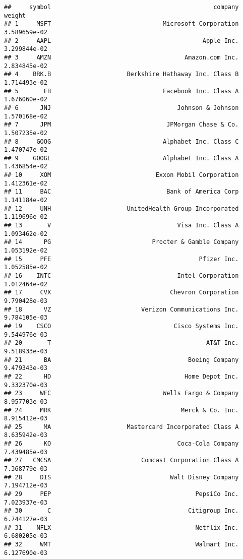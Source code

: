 \documentclass[
]{article}
\begin{document}
\begin{verbatim}
##     symbol                                             company       weight
## 1     MSFT                               Microsoft Corporation 3.589659e-02
## 2     AAPL                                          Apple Inc. 3.299844e-02
## 3     AMZN                                     Amazon.com Inc. 2.834845e-02
## 4    BRK.B                     Berkshire Hathaway Inc. Class B 1.714493e-02
## 5       FB                               Facebook Inc. Class A 1.676060e-02
## 6      JNJ                                   Johnson & Johnson 1.570168e-02
## 7      JPM                                JPMorgan Chase & Co. 1.507235e-02
## 8     GOOG                               Alphabet Inc. Class C 1.470747e-02
## 9    GOOGL                               Alphabet Inc. Class A 1.436854e-02
## 10     XOM                             Exxon Mobil Corporation 1.412361e-02
## 11     BAC                                Bank of America Corp 1.141184e-02
## 12     UNH                     UnitedHealth Group Incorporated 1.119696e-02
## 13       V                                   Visa Inc. Class A 1.093462e-02
## 14      PG                            Procter & Gamble Company 1.053192e-02
## 15     PFE                                         Pfizer Inc. 1.052585e-02
## 16    INTC                                   Intel Corporation 1.012464e-02
## 17     CVX                                 Chevron Corporation 9.790428e-03
## 18      VZ                         Verizon Communications Inc. 9.784105e-03
## 19    CSCO                                  Cisco Systems Inc. 9.544976e-03
## 20       T                                           AT&T Inc. 9.518933e-03
## 21      BA                                      Boeing Company 9.479343e-03
## 22      HD                                     Home Depot Inc. 9.332370e-03
## 23     WFC                               Wells Fargo & Company 8.957703e-03
## 24     MRK                                    Merck & Co. Inc. 8.915412e-03
## 25      MA                     Mastercard Incorporated Class A 8.635942e-03
## 26      KO                                   Coca-Cola Company 7.439485e-03
## 27   CMCSA                         Comcast Corporation Class A 7.368779e-03
## 28     DIS                                 Walt Disney Company 7.194712e-03
## 29     PEP                                        PepsiCo Inc. 7.023937e-03
## 30       C                                      Citigroup Inc. 6.744127e-03
## 31    NFLX                                        Netflix Inc. 6.680205e-03
## 32     WMT                                        Walmart Inc. 6.127690e-03

\end{verbatim}
\end{document}

